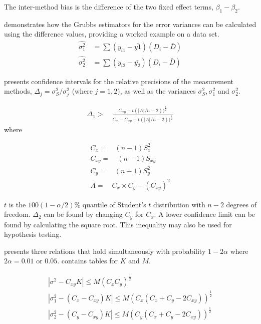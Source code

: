 \documentclass[12pt, a4paper]{report}
\theoremstyle{plain}
\theoremstyle{definition}
\theoremstyle{remark}
\begin{document}
The inter-method bias is the difference of the two fixed effect terms, $\beta_{1}-\beta_{2}$.

\citet{Kinsella} demonstrates how the Grubbs estimators for the
error variances can be calculated using the difference values,
providing a worked example on a data set.
\begin{eqnarray}
\hat{\sigma^{2}_{1}}
\quad=\sum{(y_{i1}-\bar{y{1}})(D_{i}-\bar{D})}\\
\hat{\sigma^{2}_{2}} \quad=
\sum{(y_{i2}-\bar{y_{2}})(D_{i}-\bar{D})} \nonumber
\end{eqnarray}

\citet{Thompson} presents confidence intervals for the relative
precisions of the measurement methods, $\Delta_{j}=
\sigma^2_{S}/\sigma^2_{j}$ (where $j=1,2$), as well as the
variances $\sigma^{2}_{S}, \sigma^{2}_{1}$ and $\sigma^{2}_{2}$.

\begin{eqnarray}
\Delta_{1} >\quad \frac{C_{xy}-
	t(|A|/n-2))^{\frac{1}{2}}}{C_{x}-C_{xy}+
	t(|A|/n-2))^{\frac{1}{2}}}
\end{eqnarray}
where

\begin{eqnarray}
C_{x}=\quad(n-1)S^2_{x}\nonumber\\
C_{xy}=\quad(n-1)S_{xy}\nonumber\\
C_{y}=\quad(n-1)S^2_{y}\nonumber\\
A=\quad C_{x}\times C_{y} - (C_{xy})^2 \nonumber
\end{eqnarray}

$t$ is the $100(1-\alpha/2)\%$ quantile of Student's $t$
distribution with $n-2$ degrees of freedom. $\Delta_{2}$ can be
found by changing $C_{y}$ for $C_{x}$. A lower confidence limit
can be found by calculating the square root. This inequality may
also be used for hypothesis testing.

\citet{Thompson} presents three relations that hold simultaneously
with probability $1-2\alpha$ where $2\alpha=0.01$ or $0.05$. \citet{Thompson} contains tables for $K$ and $M$.

\begin{eqnarray}
|\sigma^2-C_{xy}K|\leqslant M(C_{x}C_{y})^{\frac{1}{2}}\\
|\sigma^2_{1}-(C_{x}-C_{xy})K|\leqslant M(C_{x}(C_{x}+C_{y}-2C_{xy}))^{\frac{1}{2}}\nonumber\\
|\sigma^2_{2}-(C_{y}-C_{xy})K|\leqslant
M(C_{y}(C_{x}+C_{y}-2C_{xy}))^{\frac{1}{2}}\nonumber
\end{eqnarray}	
\end{document}
